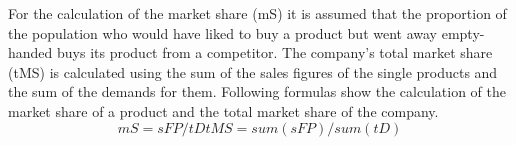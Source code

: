 For the calculation of the market share (\gls{mS}) it is assumed that the proportion of the population who would have liked to buy a product but went away empty-handed buys its product from a competitor. The company's total market share (\gls{tMS}) is calculated using the sum of the sales figures of the single products and the sum of the demands for them. Following formulas show the calculation of the market share of a product and the total market share of the company.  
\begin{equation}
\label{func:marketShare}
mS = sFP / tD
tMS = sum(sFP) / sum(tD)   
\end{equation}

